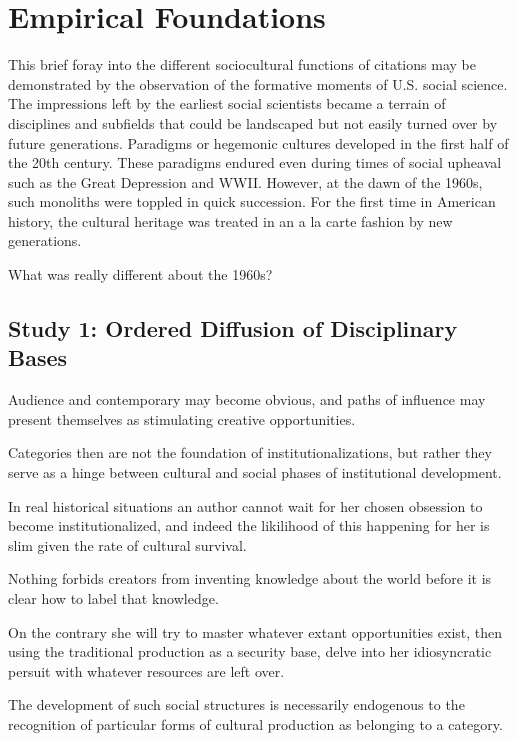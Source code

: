 \documentclass [PhD] {uclathes}
\begin{document}
\section{Empirical Foundations}\label{empirical-foundations}

This brief foray into the different sociocultural functions of citations
may be demonstrated by the observation of the formative moments of U.S.
social science. The impressions left by the earliest social scientists
became a terrain of disciplines and subfields that could be landscaped
but not easily turned over by future generations. Paradigms or hegemonic
cultures developed in the first half of the 20th century. These
paradigms endured even during times of social upheaval such as the Great
Depression and WWII. However, at the dawn of the 1960s, such monoliths
were toppled in quick succession. For the first time in American
history, the cultural heritage was treated in an a la carte fashion by
new generations.

What was really different about the 1960s?

\subsection{Study 1: Ordered Diffusion of Disciplinary
Bases}\label{study-1-ordered-diffusion-of-disciplinary-bases}

Audience and contemporary may become obvious, and paths of influence may
present themselves as stimulating creative opportunities.

Categories then are not the foundation of institutionalizations, but
rather they serve as a hinge between cultural and social phases of
institutional development.

In real historical situations an author cannot wait for her chosen
obsession to become institutionalized, and indeed the likilihood of this
happening for her is slim given the rate of cultural survival.

Nothing forbids creators from inventing knowledge about the world before
it is clear how to label that knowledge.

On the contrary she will try to master whatever extant opportunities
exist, then using the traditional production as a security base, delve
into her idiosyncratic persuit with whatever resources are left over.

The development of such social structures is necessarily endogenous to
the recognition of particular forms of cultural production as belonging
to a category.
\end{document}
